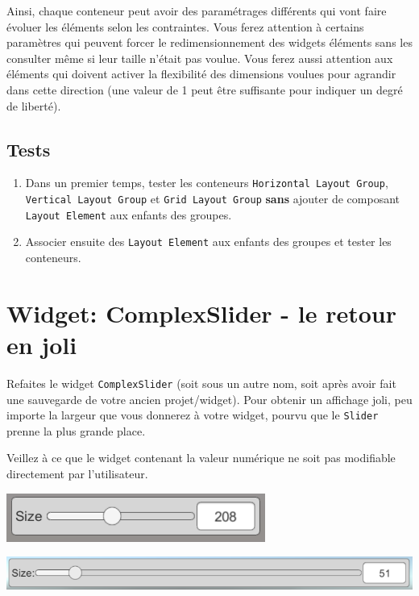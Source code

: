 \documentclass[a4paper,10pt]{article}
\begin{document}
Ainsi, chaque conteneur peut avoir des paramétrages différents qui vont faire évoluer les éléments selon les contraintes. Vous ferez attention à certains paramètres qui peuvent forcer le redimensionnement des widgets éléments sans les consulter même si leur taille n'était pas voulue. Vous ferez aussi attention aux éléments qui doivent activer la flexibilité des dimensions voulues pour agrandir dans cette direction (une valeur de 1 peut être suffisante pour indiquer un degré de liberté).

\subsection*{Tests}

\begin{enumerate}
	\item Dans un premier temps, tester les conteneurs \texttt{Horizontal Layout Group}, \texttt{Vertical Layout Group} et \texttt{Grid Layout Group} \textbf{sans} ajouter de composant \texttt{Layout Element} aux enfants des groupes.
	\item Associer ensuite des \texttt{Layout Element} aux enfants des groupes et tester les conteneurs.
\end{enumerate}

\section{Widget: ComplexSlider - le retour en joli}

Refaites le widget \texttt{ComplexSlider} (soit sous un autre nom, soit après avoir fait une sauvegarde de votre ancien projet/widget). Pour obtenir un affichage joli, peu importe la largeur que vous donnerez à votre widget, pourvu que le \texttt{Slider} prenne la plus grande place.

Veillez à ce que le widget contenant la valeur numérique ne soit pas modifiable directement par l'utilisateur.

\begin{center}
	\includegraphics[width=0.6\linewidth]{rc/ui_complexslider_layout}

	\includegraphics[width=0.8\linewidth]{rc/ui_complexslider_layout_v2}
	
\end{center}
\end{document}
